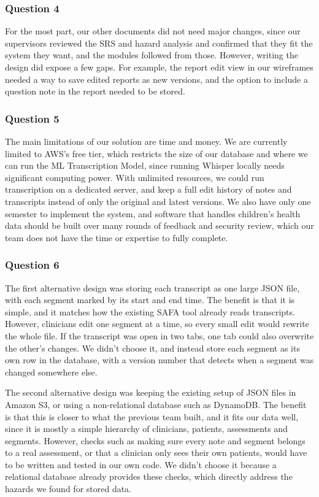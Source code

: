\documentclass[12pt, titlepage]{article}
\begin{document}
\begin{enumerate}
\subsubsection*{Question 4}
For the most part, our other documents did not need major changes, since our supervisors reviewed the SRS and hazard analysis and confirmed that they fit the system they want, and the modules followed from those. However, writing the design did expose a few gaps. For example, the report edit view in our wireframes needed a way to save edited reports as new versions, and the option to include a question note in the report needed to be stored.

\subsubsection*{Question 5}
The main limitations of our solution are time and money. We are currently limited to AWS's free tier, which restricts the size of our database and where we can run the ML Transcription Model, since running Whisper locally needs significant computing power. With unlimited resources, we could run transcription on a dedicated server, and keep a full edit history of notes and transcripts instead of only the original and latest versions. We also have only one semester to implement the system, and software that handles children's health data should be built over many rounds of feedback and security review, which our team does not have the time or expertise to fully complete.

\subsubsection*{Question 6}
The first alternative design was storing each transcript as one large JSON file, with each segment marked by its start and end time.
The benefit is that it is simple, and it matches how the existing SAFA tool already reads transcripts.
However, clinicians edit one segment at a time, so every small edit would rewrite the whole file. If the transcript was open in two tabs, one tab could also overwrite the other's changes.
We didn't choose it, and instead store each segment as its own row in the database, with a version number that detects when a segment was changed somewhere else.

The second alternative design was keeping the existing setup of JSON files in Amazon S3, or using a non-relational database such as DynamoDB.
The benefit is that this is closer to what the previous team built, and it fits our data well, since it is mostly a simple hierarchy of clinicians, patients, assessments and segments.
However, checks such as making sure every note and segment belongs to a real assessment, or that a clinician only sees their own patients, would have to be written and tested in our own code.
We didn't choose it because a relational database already provides these checks, which directly address the hazards we found for stored data.


\end{enumerate}
\end{document}
